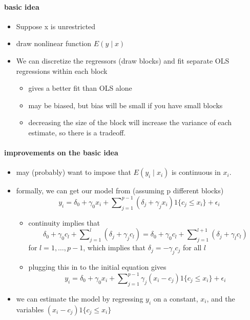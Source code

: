 \paragraph{basic idea}
\label{sec-1-3-1-2}

\begin{itemize}
\item Suppose x is unrestricted
\item draw nonlinear function $E(y \mid x)$
\item We can discretize the regressors (draw blocks) and fit
         separate OLS regressions within each block
\begin{itemize}
\item gives a better fit than OLS alone
\item may be biased, but bias will be small if you have small
           blocks
\item decreasing the size of the block will increase the variance
           of each estimate, so there is a tradeoff.
\end{itemize}
\end{itemize}
\paragraph{improvements on the basic idea}
\label{sec-1-3-1-3}

\begin{itemize}
\item may (probably) want to impose that $E(y_i \mid x_i)$ is
         continuous in $x_i$.
\item formally, we can get our model from (assuming p different blocks)
         \[ y_i = \delta_0 + \gamma_0 x_i + \sum\nolimits_{j=1}^{p-1} (\delta_j + \gamma_j x_i) 1\{c_j \leq
         x_i\} + \epsilon_i\]
\begin{itemize}
\item continuity implies that
           \[ \delta_0 + \gamma_0 c_l + \sum\nolimits_{j=1}^l (\delta_j +
           \gamma_j c_l) = \delta_0 + \gamma_0 c_l + \sum\nolimits_{j=1}^{l+1}
           (\delta_j + \gamma_l c_l)\] 
           for $l = 1,\dots,p-1$, which implies that $\delta_j = -
           \gamma_j c_j$ for all $l$
\item plugging this in to the initial equation gives
           \[ y_i = \delta_0 + \gamma_0 x_i + \sum\nolimits_{j=1}^{p-1}
           \gamma_j (x_i - c_j) 1\{c_j \leq x_i\} + \epsilon_i\]
\end{itemize}
\item we can estimate the model by regressing $y_i$ on a constant,
         $x_i$, and the variables $(x_i - c_j) 1\{c_j \leq x_i\}$
\end{itemize}
